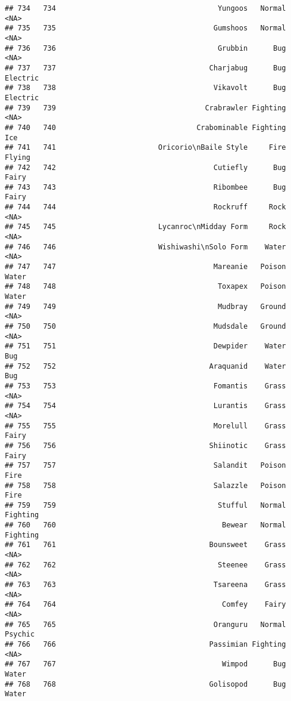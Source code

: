 \documentclass[
]{article}
\begin{document}
\begin{verbatim}
## 734   734                                      Yungoos   Normal     <NA>
## 735   735                                     Gumshoos   Normal     <NA>
## 736   736                                      Grubbin      Bug     <NA>
## 737   737                                    Charjabug      Bug Electric
## 738   738                                     Vikavolt      Bug Electric
## 739   739                                   Crabrawler Fighting     <NA>
## 740   740                                 Crabominable Fighting      Ice
## 741   741                        Oricorio\nBaile Style     Fire   Flying
## 742   742                                     Cutiefly      Bug    Fairy
## 743   743                                     Ribombee      Bug    Fairy
## 744   744                                     Rockruff     Rock     <NA>
## 745   745                        Lycanroc\nMidday Form     Rock     <NA>
## 746   746                        Wishiwashi\nSolo Form    Water     <NA>
## 747   747                                     Mareanie   Poison    Water
## 748   748                                      Toxapex   Poison    Water
## 749   749                                      Mudbray   Ground     <NA>
## 750   750                                     Mudsdale   Ground     <NA>
## 751   751                                     Dewpider    Water      Bug
## 752   752                                    Araquanid    Water      Bug
## 753   753                                     Fomantis    Grass     <NA>
## 754   754                                     Lurantis    Grass     <NA>
## 755   755                                     Morelull    Grass    Fairy
## 756   756                                    Shiinotic    Grass    Fairy
## 757   757                                     Salandit   Poison     Fire
## 758   758                                     Salazzle   Poison     Fire
## 759   759                                      Stufful   Normal Fighting
## 760   760                                       Bewear   Normal Fighting
## 761   761                                    Bounsweet    Grass     <NA>
## 762   762                                      Steenee    Grass     <NA>
## 763   763                                     Tsareena    Grass     <NA>
## 764   764                                       Comfey    Fairy     <NA>
## 765   765                                     Oranguru   Normal  Psychic
## 766   766                                    Passimian Fighting     <NA>
## 767   767                                       Wimpod      Bug    Water
## 768   768                                    Golisopod      Bug    Water

\end{verbatim}
\end{document}
